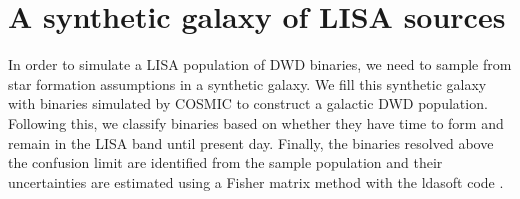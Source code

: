 \documentclass[twocolumn]{aastex631}
\begin{document}
 \section{A synthetic galaxy of LISA sources}
\label{sec:galaxy}

In order to simulate a LISA population of DWD binaries,
    we need to sample from star formation assumptions in a synthetic galaxy.
We fill this synthetic galaxy with binaries simulated by COSMIC
    to construct a galactic DWD population.
Following this, we classify binaries
    based on whether they have time to form and
    remain in the LISA band until present day.
Finally, the binaries resolved above the confusion limit
    are identified from the sample population
    and their uncertainties are estimated using a Fisher matrix
    method with the ldasoft code \citep{ldasoft}.
\end{document}
